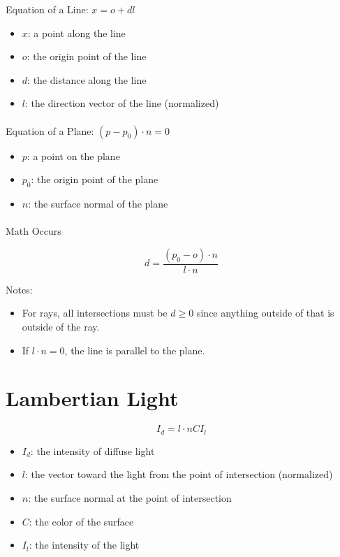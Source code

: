 \documentclass{article}
\begin{document}
Equation of a Line: \(x = o + d l \)

\begin{itemize}
\item \(x\): a point along the line
\item \(o\): the origin point of the line
\item \(d\): the distance along the line
\item \(l\): the direction vector of the line (normalized)
\end{itemize}

\paragraph{}
Equation of a Plane: \((p - p_0) \cdot n = 0\)

\begin{itemize}
\item \(p\): a point on the plane
\item \(p_0\): the origin point of the plane
\item \(n\): the surface normal of the plane
\end{itemize}

\paragraph{}

Math Occurs

\[d = \frac{(p_0 - o) \cdot n}{l \cdot n}\]

Notes:

\begin{itemize}
\item For rays, all intersections must be \(d \geq 0\) since anything outside of
  that is outside of the ray.
\item If \(l \cdot n = 0\), the line is parallel to the plane.
\end{itemize}

\section{Lambertian Light}

\[I_d = l \cdot n C I_l\]

\begin{itemize}
\item \(I_d\): the intensity of diffuse light
\item \(l\): the vector toward the light from the point of intersection
  (normalized)
\item \(n\): the surface normal at the point of intersection
\item \(C\): the color of the surface
\item \(I_l\): the intensity of the light
\end{itemize}
\end{document}
